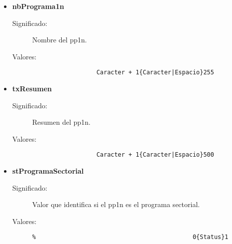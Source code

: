 \begin{itemize}
\begin{description}
			\end{description}
		\item \textbf{nbPrograma1n}
			\begin{description}
				\item [Significado:] Nombre del pp1n.
				\item [Valores:]{
				  \begin{lstlisting}
				  Caracter + 1{Caracter|Espacio}255
				  \end{lstlisting}}
			\end{description}
		\item \textbf{txResumen}
			\begin{description}
				\item [Significado:] Resumen del pp1n.
				\item [Valores:]{
				  \begin{lstlisting}
				  Caracter + 1{Caracter|Espacio}500
				  \end{lstlisting}}
			\end{description}
		\item \textbf{stProgramaSectorial}
			\begin{description}
				\item [Significado:] Valor que identifica si el pp1n es el programa sectorial.
				\item [Valores:]{\begin{lstlisting}
%                                            0{Status}1
                                         \end{lstlisting}} 
			\end{description}
	\end{itemize}
% 

